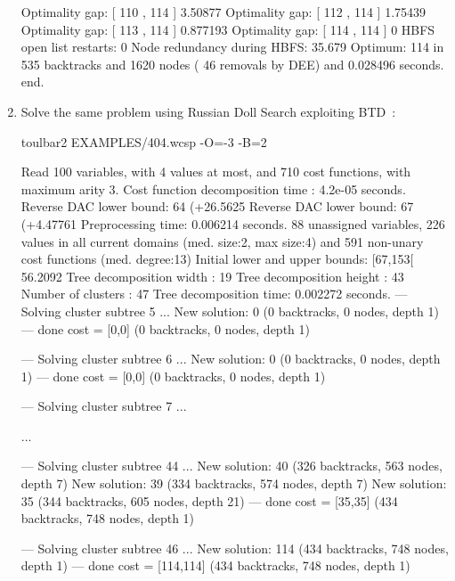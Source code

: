 \begin{enumerate}
{\begin{DoxyCode}
Optimality gap: [ 110 , 114 ] 3.50877 %
Optimality gap: [ 112 , 114 ] 1.75439 %
Optimality gap: [ 113 , 114 ] 0.877193 %
Optimality gap: [ 114 , 114 ] 0 %
HBFS open list restarts: 0 %
Node redundancy during HBFS: 35.679 %
Optimum: 114 in 535 backtracks and 1620 nodes ( 46 removals by DEE) and 0.028496 seconds.
end.
\end{DoxyCode}}
\item Solve the same problem using Russian Doll Search exploiting BTD~\cite{Sanchez09a}:
\begin{DoxyCode}
	toulbar2 EXAMPLES/404.wcsp -O=-3 -B=2
\end{DoxyCode}
{\scriptsize
\begin{DoxyCode}
Read 100 variables, with 4 values at most, and 710 cost functions, with maximum arity 3.
Cost function decomposition time : 4.2e-05 seconds.
Reverse DAC lower bound: 64 (+26.5625%
Reverse DAC lower bound: 67 (+4.47761%
Preprocessing time: 0.006214 seconds.
88 unassigned variables, 226 values in all current domains (med. size:2, max size:4) and 591 non-unary cost functions (med. degree:13)
Initial lower and upper bounds: [67,153[ 56.2092%
Tree decomposition width  : 19
Tree decomposition height : 43
Number of clusters        : 47
Tree decomposition time: 0.002272 seconds.
--- Solving cluster subtree 5 ...
New solution: 0 (0 backtracks, 0 nodes, depth 1)
---  done  cost = [0,0] (0 backtracks, 0 nodes, depth 1)

--- Solving cluster subtree 6 ...
New solution: 0 (0 backtracks, 0 nodes, depth 1)
---  done  cost = [0,0] (0 backtracks, 0 nodes, depth 1)

--- Solving cluster subtree 7 ...

...

--- Solving cluster subtree 44 ...
New solution: 40 (326 backtracks, 563 nodes, depth 7)
New solution: 39 (334 backtracks, 574 nodes, depth 7)
New solution: 35 (344 backtracks, 605 nodes, depth 21)
---  done  cost = [35,35] (434 backtracks, 748 nodes, depth 1)

--- Solving cluster subtree 46 ...
New solution: 114 (434 backtracks, 748 nodes, depth 1)
---  done  cost = [114,114] (434 backtracks, 748 nodes, depth 1)


\end{DoxyCode}}
\end{enumerate}
